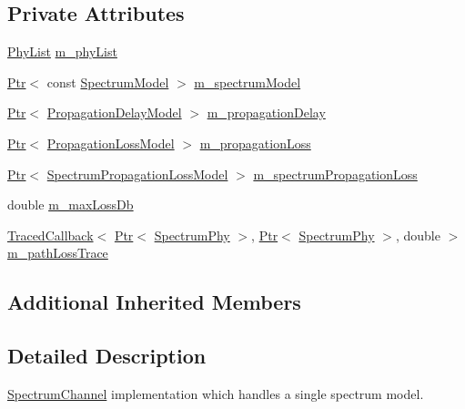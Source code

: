 \subsection*{Private Attributes}
\begin{DoxyCompactItemize}
\item 
\hyperlink{classns3_1_1SingleModelSpectrumChannel_ae4074733fa381728394ce6e8a54dc664}{Phy\+List} \hyperlink{classns3_1_1SingleModelSpectrumChannel_a119d78d112dab0990a78599a4f2e7a9e}{m\+\_\+phy\+List}
\item 
\hyperlink{classns3_1_1Ptr}{Ptr}$<$ const \hyperlink{classns3_1_1SpectrumModel}{Spectrum\+Model} $>$ \hyperlink{classns3_1_1SingleModelSpectrumChannel_a091b6ed95481cac790c42f20a8f4c429}{m\+\_\+spectrum\+Model}
\item 
\hyperlink{classns3_1_1Ptr}{Ptr}$<$ \hyperlink{classns3_1_1PropagationDelayModel}{Propagation\+Delay\+Model} $>$ \hyperlink{classns3_1_1SingleModelSpectrumChannel_a7149d0ddac473b3d83969ad6445a2cc6}{m\+\_\+propagation\+Delay}
\item 
\hyperlink{classns3_1_1Ptr}{Ptr}$<$ \hyperlink{classns3_1_1PropagationLossModel}{Propagation\+Loss\+Model} $>$ \hyperlink{classns3_1_1SingleModelSpectrumChannel_a9a9d930ce79583ff7b1e4a73a551765d}{m\+\_\+propagation\+Loss}
\item 
\hyperlink{classns3_1_1Ptr}{Ptr}$<$ \hyperlink{classns3_1_1SpectrumPropagationLossModel}{Spectrum\+Propagation\+Loss\+Model} $>$ \hyperlink{classns3_1_1SingleModelSpectrumChannel_adc3d2a753657da18986c30751e3f79f4}{m\+\_\+spectrum\+Propagation\+Loss}
\item 
double \hyperlink{classns3_1_1SingleModelSpectrumChannel_a77e85736d9520060359b9d2f420c0747}{m\+\_\+max\+Loss\+Db}
\item 
\hyperlink{classns3_1_1TracedCallback}{Traced\+Callback}$<$ \hyperlink{classns3_1_1Ptr}{Ptr}$<$ \hyperlink{classns3_1_1SpectrumPhy}{Spectrum\+Phy} $>$, \hyperlink{classns3_1_1Ptr}{Ptr}$<$ \hyperlink{classns3_1_1SpectrumPhy}{Spectrum\+Phy} $>$, double $>$ \hyperlink{classns3_1_1SingleModelSpectrumChannel_ac20ae2c0f27bed879388820857b97599}{m\+\_\+path\+Loss\+Trace}
\end{DoxyCompactItemize}
\subsection*{Additional Inherited Members}


\subsection{Detailed Description}
\hyperlink{classns3_1_1SpectrumChannel}{Spectrum\+Channel} implementation which handles a single spectrum model. 

